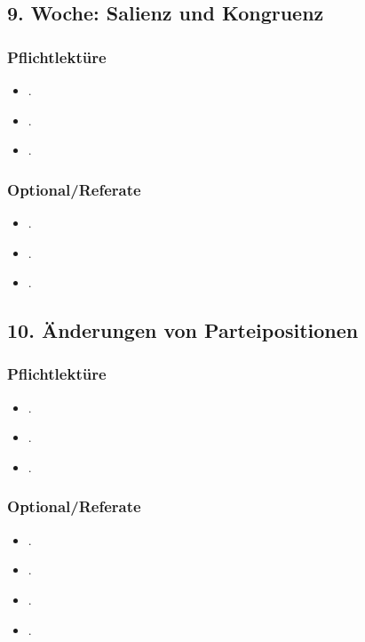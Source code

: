 \documentclass[abstract=on,parskip=full,headings=standardclasses,fontsize=11pt,paper=a4]{scrartcl}
\begin{document}
\subsection{9. Woche: Salienz und Kongruenz}

\subsubsection*{Pflichtlektüre}
\begin{itemize}
\item {}.
\item {}.
\item {}.
\end{itemize}

\subsubsection*{Optional/Referate}
\begin{itemize}
\item {}.
\item {}.
\item {}.
\end{itemize}


\subsection{10. Änderungen von Parteipositionen}

\subsubsection*{Pflichtlektüre}
\begin{itemize}
\item {}.
\item {}.
\item {}.
\end{itemize}



\subsubsection*{Optional/Referate}
\begin{itemize}
\item {}.
\item {}.
\item {}.
\item {}.
\end{itemize}
\end{document}
